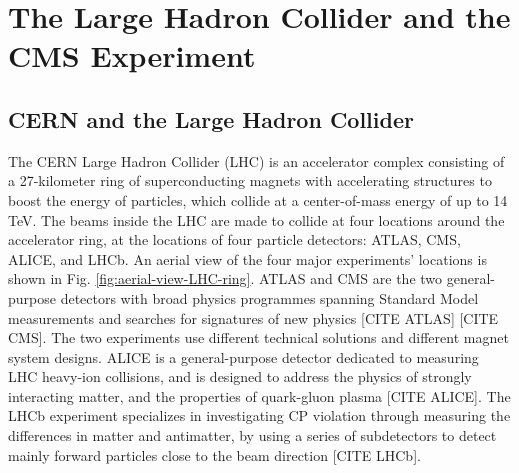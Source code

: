 \documentclass{article}
\begin{document}
\section{The Large Hadron Collider and the CMS Experiment}


\subsection{CERN and the Large Hadron Collider}

The CERN Large Hadron Collider (LHC) is an accelerator complex consisting of a 27-kilometer ring of superconducting magnets with accelerating structures to boost the energy of particles, which collide at a center-of-mass energy of up to 14 TeV. The beams inside the LHC are made to collide at four locations around the accelerator ring, at the locations of four particle detectors: ATLAS, CMS, ALICE, and LHCb. An aerial view of the four major experiments' locations is shown in Fig. \ref{fig:aerial-view-LHC-ring}. ATLAS and CMS are the two general-purpose detectors with broad physics programmes spanning Standard Model measurements and searches for signatures of new physics [CITE ATLAS] [CITE CMS]. The two experiments use different technical solutions and different magnet system designs. ALICE is a general-purpose detector dedicated to measuring LHC heavy-ion collisions, and is designed to address the physics of strongly interacting matter, and the properties of quark-gluon plasma [CITE ALICE]. The LHCb experiment specializes in investigating CP violation through measuring the differences in matter and antimatter, by using a series of subdetectors to detect mainly forward particles close to the beam direction [CITE LHCb]. 
\end{document}

